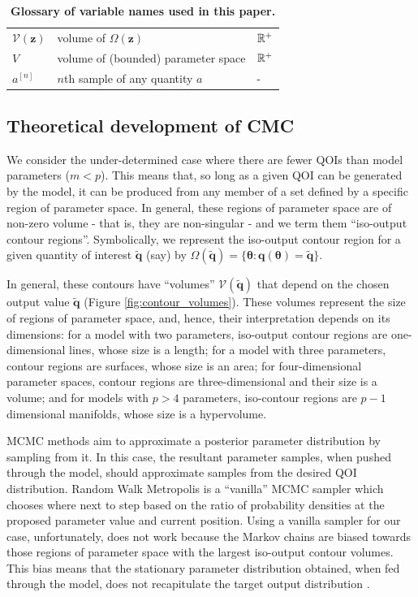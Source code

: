 \begin{table}[htbp]
\begin{adjustwidth}{-0.6in}{0in}
\begin{tabularx}{1.2\textwidth}{lll}
$\mathcal{V}(\boldsymbol{z})$         & volume of $\Omega(\boldsymbol{z})$                                 & $\mathbb{R}^+$ \\
$V$                                   & volume of (bounded) parameter space                                          & $\mathbb{R}^+$ \\
$a^{[n]}$ & $n$th sample of any quantity $a$ & -\\
\end{tabularx}
\caption{\textbf{Glossary of variable names used in this paper.}}
\label{tab:variable_glossary}
\end{adjustwidth}
\end{table}




\subsection{Theoretical development of CMC}
We consider the under-determined case where there are fewer QOIs than model parameters ($m<p$). This means that, so long as a given QOI can be generated by the model, it can be produced from any member of a set defined by a specific region of parameter space. In general, these regions of parameter space are of non-zero volume - that is, they are non-singular - and we term them ``iso-output contour regions''. Symbolically, we represent the iso-output contour region for a given quantity of interest $\tilde{\boldsymbol{q}}$ (say) by $\Omega(\tilde{\boldsymbol{q}}) = \{\boldsymbol{\theta}: \boldsymbol{q}(\boldsymbol{\theta}) = \tilde{\boldsymbol{q}}\}$.

In general, these contours have ``volumes'' $\mathcal{V}(\tilde{\boldsymbol{q}})$ that depend on the chosen output value $\tilde{\boldsymbol{q}}$ (Figure \ref{fig:contour_volumes}). These volumes represent the size of regions of parameter space, and, hence, their interpretation depends on its dimensions: for a model with two parameters, iso-output contour regions are one-dimensional lines, whose size is a length; for a model with three parameters, contour regions are surfaces, whose size is an area; for four-dimensional parameter spaces, contour regions are three-dimensional and their size is a volume; and for models with $p>4$ parameters, iso-contour regions are $p-1$ dimensional manifolds, whose size is a hypervolume.

MCMC methods aim to approximate a posterior parameter distribution by sampling from it. In this case, the resultant parameter samples, when pushed through the model, should approximate samples from the desired QOI distribution. Random Walk Metropolis \cite{lambert2018Student} is a ``vanilla'' MCMC sampler which chooses where next to step based on the ratio of probability densities at the proposed parameter value and current position. Using a vanilla sampler for our case, unfortunately, does not work because the Markov chains are biased towards those regions of parameter space with the largest iso-output contour volumes. This bias means that the stationary parameter distribution obtained, when fed through the model, does not recapitulate the target output distribution \cite{lambert2018inverse}.

